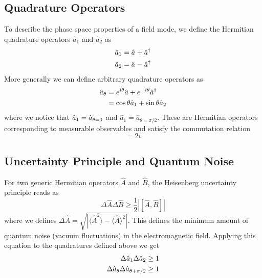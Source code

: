 \subsection*{Quadrature Operators}

To describe the phase space properties of a field mode, we define the Hermitian quadrature operators $\hat{a}_{1}$ and $\hat{a}_{2}$ as
\begin{equation}
  \begin{split}
    \hat{a}_{1} &= \hat{a}^{\vphantom{\dagger}} + \hat{a}^\dagger  \\
    \hat{a}_{2} &= \hat{a}^{\vphantom{\dagger}} - \hat{a}^\dagger
  \end{split}
\end{equation}
More generally we can define arbitrary quadrature operators as 
\begin{align}
  \hat{a}_{\theta} &= e^{i\theta}\hat{a}+ e^{-i\theta}\hat{a}^{\dagger} \notag \\ 
  & = \cos \theta \hat{a}_{1} + \sin \theta \hat{a}_{2}
\end{align}
where we notice that $\hat{a}_{1} = \hat{a}_{\theta=0\vphantom{\pi/2}}$ and $\hat{a}_{1} = \hat{a}_{\theta=\pi/2}$. These are Hermitian operators corresponding to measurable observables and satisfy the commutation relation
\begin{equation}
[a_{\theta \vphantom{\pi/2}}, a_{\theta+\pi/2}] = 2i
\end{equation}

\subsection*{Uncertainty Principle and Quantum Noise}

For two generic Hermitian operators $\hat{A}$ and $\hat{B}$, the Heisenberg uncertainty principle reads as 
\begin{equation}
  \Delta \hat{A}\Delta \hat{B} \geq \frac{1}{2} |[\hat{A}, \hat{B}]|
\end{equation}
where we defines $\Delta \hat{A}=\sqrt{|\langle \hat{A}^2\rangle - \langle \hat{A} \rangle^2|}$. This defines the minimum amount of quantum noise (vacuum fluctuations) in the electromagnetic field.
Applying this equation to the quadratures defined above we get 
\begin{equation}
   \begin{split}
    \Delta \hat{a}_{1} \Delta \hat{a}_{2} &\geq 1 \\
    \Delta \hat{a}_{\theta \vphantom{\pi/2}} \Delta \hat{a}_{\theta +\pi/2} &\geq 1
   \end{split}
\end{equation}
